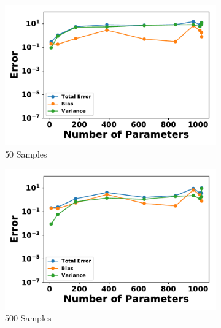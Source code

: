 \documentclass[letterpaper]{article} %
\begin{document}
        
        \begin{figure}[p]
          \centering
          \begin{subfigure}[b]{0.245\textwidth}
              \centering
              \includegraphics[width=\textwidth]{./HBM_Error_vs_Order_Samples50-eps-converted-to.pdf}
              \caption{50 Samples}
          \end{subfigure}
          \begin{subfigure}[b]{0.245\textwidth}
              \centering
              \includegraphics[width=\textwidth]{./HBM_Error_vs_Order_Samples500-eps-converted-to.pdf}
              \caption{500 Samples}
          \end{subfigure}
          \begin{subfigure}[b]{0.245\textwidth}
              \centering

\end{subfigure}
\end{figure}
\end{document}
